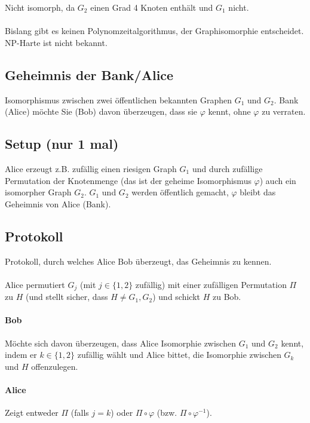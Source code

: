 Nicht isomorph, da $G_2$ einen Grad 4 Knoten enthält und $G_1$ nicht.

\paragraph*{} Bislang gibt es keinen Polynomzeitalgorithmus, der Graphisomorphie entscheidet. NP-Harte ist nicht bekannt.

\subsection{Geheimnis der Bank/Alice} Isomorphismus zwischen zwei öffentlichen bekannten Graphen $G_1$ und $G_2$. Bank (Alice) möchte Sie (Bob) davon überzeugen, dass sie $\varphi$ kennt, ohne $\varphi$ zu verraten.

\subsection{Setup (nur 1 mal)}
Alice erzeugt z.B. zufällig einen riesigen Graph $G_1$  und durch zufällige Permutation der Knotenmenge (das ist der geheime Isomorphismus $\varphi$) auch ein isomorpher Graph $G_2$. $G_1$ und $G_2$ werden öffentlich gemacht, $\varphi$ bleibt das Geheimnis von Alice (Bank).

\subsection{Protokoll}
Protokoll, durch welches Alice Bob überzeugt, das Geheimnis zu kennen.

\paragraph*{} Alice permutiert $G_j$ (mit $j \in \{ 1,2 \}$ zufällig) mit einer zufälligen Permutation $\Pi$ zu $H$ (und stellt sicher, dass $H \not= G_1,G_2$) und schickt $H$ zu Bob.

\paragraph*{Bob} Möchte sich davon überzeugen, dass Alice Isomorphie zwischen $G_1$ und $G_2$ kennt, indem er $k \in \{ 1,2 \}$ zufällig wählt und Alice bittet, die Isomorphie zwischen $G_k$ und $H$ offenzulegen.

\paragraph*{Alice} Zeigt entweder $\Pi$ (falls $j=k$) oder $\Pi \circ \varphi$ (bzw. $\Pi \circ \varphi^{-1}$).

